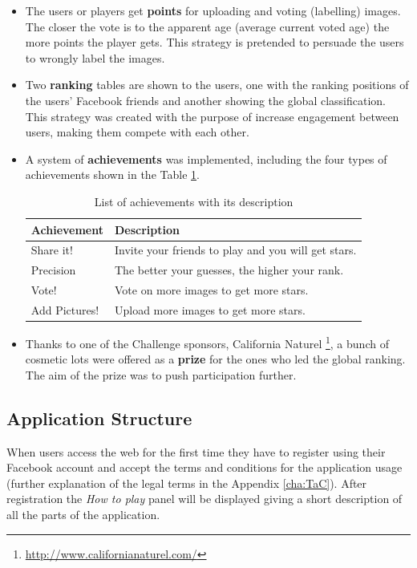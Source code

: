 \begin{itemize}
	\item The users or players get \textbf{points} for uploading and voting (labelling) images. The closer the vote is to the apparent age (average current voted age) the more points the player gets. This strategy is pretended to persuade the users to wrongly label the images.
	\item Two \textbf{ranking} tables are shown to the users, one with the ranking positions of the users' Facebook friends and another showing the global classification. This strategy was created with the purpose of increase engagement between users, making them compete with each other. 
	\item A system of \textbf{achievements} was implemented, including the four types of achievements shown in the Table \ref{tab:achiev}.
	\begin{table}[!h]
		\centering
		\begin{tabular}{l|l}
			\textbf{Achievement} & \textbf{Description} \\ \hline
			Share it! &	Invite your friends to play and you will get stars.	\\
			Precision &	The better your guesses, the higher your rank. \\
			Vote! &	Vote on more images to get more stars.\\	
			Add Pictures! &	Upload more images to get more stars. \\
		\end{tabular}
		\caption{List of achievements with its description}
		\label{tab:achiev}
	\end{table}
	\item Thanks to one of the Challenge sponsors, California Naturel \footnote{\url{http://www.californianaturel.com/}}, a bunch of cosmetic lots were offered as a \textbf{prize} for the ones who led the global ranking. The aim of the prize was to push participation further.
\end{itemize}


\subsection{Application Structure}
When users access the web for the first time they have to register using their Facebook account and accept the terms and conditions for the application usage (further explanation of the legal terms in the Appendix \ref{cha:TaC}). After registration the \textit{How to play} panel will be displayed giving a short description of all the parts of the application.

